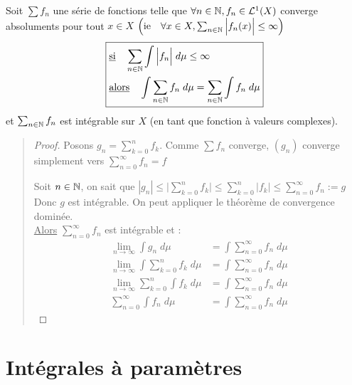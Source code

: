 \begin{theorem}
    Soit $ \sum f_n$ une série de fonctions telle que $ \forall n \in \mathbb{N}, f_n \in \mathcal{L}^1(X)$ converge absoluments pour tout $x \in X$
    $ \Big( \text{ie} \quad \forall x \in X, \sum_{n \in \mathbb{N}} \Big| f_n (x) \Big| \le \infty \Big)$
    \[ \boxed{
    \begin{aligned}
        & \text{\underline{si}} \quad  \sum_{n \in \mathbb{N}} \int \Big| f_n \Big| \; d \mu \le \infty \\
        & \text{\underline{alors}} \quad \int \sum_{n \in \mathbb{N}} f_n \; d \mu = \sum_{n \in \mathbb{N}} \int f_n \; d \mu 
    \end{aligned} }
    \]
    et $\sum_{n \in \mathbb{N}} f_n$ est intégrable sur $X$ (en tant que fonction à valeurs complexes).
\end{theorem}

\begin{quote}
\footnotesize
\begin{proof}
    Posons $g_n = \sum_{k=0}^{n} f_k$. Comme $\sum f_n$ converge, $(g_n)$ converge simplement vers $\sum_{n=0}^{\infty} f_n = f $

    Soit $n \in \mathbb{N}$, on sait que $ |g_n| \leq \Big| \sum_{k=0}^{n} f_k \Big| \leq \sum_{k=0}^{n} | f_k | \leq \sum_{n=0}^{\infty} f_n := g $
    Donc $g$ est intégrable. On peut appliquer le théorème de convergence dominée. \\
    \underline{Alors} $ \sum_{n=0}^{\infty} f_n$ est intégrable et :
    \begin{align*}
        \lim_{n \to \infty} \int g_n \; d \mu &= \int \sum_{n=0}^{\infty} f_n \; d \mu \\
        \lim_{n\to\infty} \int \sum_{k=0}^{n} f_k \; d \mu &= \int \sum_{n=0}^{\infty} f_n \; d \mu \\
        \lim_{n\to\infty} \sum_{k=0}^{n} \int f_k \; d \mu &= \int \sum_{n=0}^{\infty} f_n \; d \mu \\
        \sum_{n=0}^{\infty} \int f_n \; d \mu &= \int \sum_{n=0}^{\infty} f_n \; d \mu 
    \end{align*}
\end{proof}
\normalsize
\end{quote}



\section{Intégrales à paramètres}


